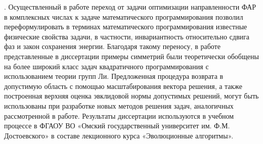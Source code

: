 {\theorInfluence}.
Осуществленный в работе переход от задачи оптимизации направленности ФАР в комплексных числах к задаче математического программирования позволил переформулировать в терминах математического программирования известные физические свойства задачи, в частности, инвариантность относительно сдвига фаз и закон сохранения энергии. Благодаря такому переносу, в работе~ представленные в диссертации примеры симметрий были теоретически обобщены на более широкий класс задач квадратичного программирования с использованием теории групп Ли. Предложенная процедура возврата в допустимую область с помощью масштабирования вектора решения, а также построенная верхняя оценка эвклидовой нормы допустимых решений, могут быть использованы при разработке новых методов решения задач, аналогичных рассмотренной в работе. Результаты диссертации используются в учебном процессе в ФГАОУ ВО «Омский государственный университет им. Ф.М. Достоевского» в составе лекционного курса «Эволюционные алгоритмы».


{\methods}


